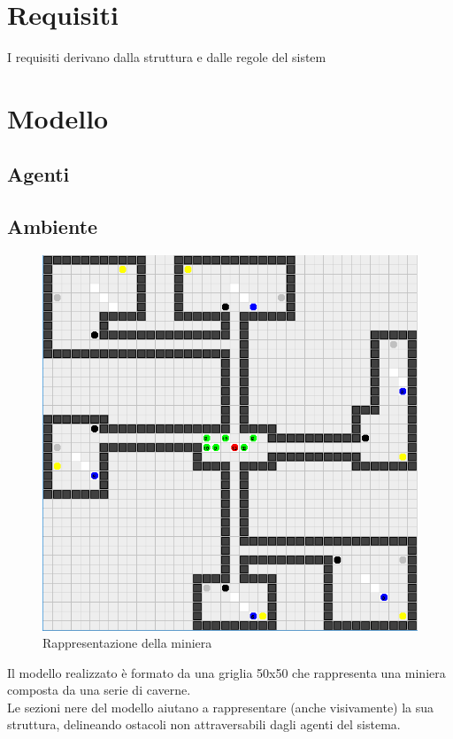 \documentclass{llncs}
\newcommand{\labelsec}[1]{\label{sec:#1}}
\begin{document}
\section{Requisiti}
I requisiti derivano dalla struttura e dalle regole del sistem
\newpage
\section{Modello}
\labelsec{Modello}
\subsection{Agenti}
\newpage
\subsection{Ambiente}
\begin{figure}[htbp]
  \centering
   \includegraphics[scale = 0.55]{img/miniera.png}
  \caption{Rappresentazione della miniera}
\end{figure}
Il modello realizzato è formato da una griglia 50x50 che rappresenta una miniera composta da una serie di caverne.\\
Le sezioni nere del modello aiutano a rappresentare (anche visivamente) la sua struttura, delineando ostacoli non attraversabili dagli agenti del sistema.\\
\end{document}
